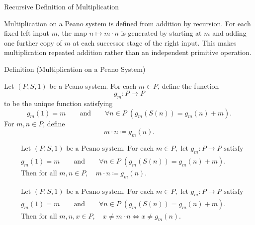 \begin{topicbox}{Recursive Definition of Multiplication}
\begin{exposition}
Multiplication on a Peano system is defined from addition by recursion. For
each fixed left input $m$, the map $n \mapsto m \cdot n$ is generated by
starting at $m$ and adding one further copy of $m$ at each successor stage of
the right input. This makes multiplication repeated addition rather than an
independent primitive operation.
\end{exposition}

\begin{definitionbox}{Definition (Multiplication on a Peano System)}
\begin{definition}
\label{def:multiplication-on-peano-system}
Let $(P,S,1)$ be a Peano system. For each $m \in P$, define the function
\[
g_m : P \to P
\]
to be the unique function satisfying
\[
g_m(1)=m
\qquad\text{and}\qquad
\forall n \in P\;(g_m(S(n))=g_m(n)+m).
\]
For $m,n \in P$, define
\[
m \cdot n \coloneqq g_m(n).
\]
\end{definition}
\end{definitionbox}

\begin{remark*}
\[
\begin{aligned}
&\text{Let } (P,S,1) \text{ be a Peano system. For each } m \in P,
\text{ let } g_m : P \to P \text{ satisfy}\\
&g_m(1)=m
\qquad\text{and}\qquad
\forall n \in P\;(g_m(S(n))=g_m(n)+m).\\
&\text{Then for all } m,n \in P,\quad m \cdot n \coloneqq g_m(n).
\end{aligned}
\]
\end{remark*}

\begin{remark*}
\[
\begin{aligned}
&\text{Let } (P,S,1) \text{ be a Peano system. For each } m \in P,
\text{ let } g_m : P \to P \text{ satisfy}\\
&g_m(1)=m
\qquad\text{and}\qquad
\forall n \in P\;(g_m(S(n))=g_m(n)+m).\\
&\text{Then for all } m,n,x \in P,\quad x \neq m \cdot n
\Longleftrightarrow
x \neq g_m(n).
\end{aligned}
\]
\end{remark*}


\end{topicbox}
